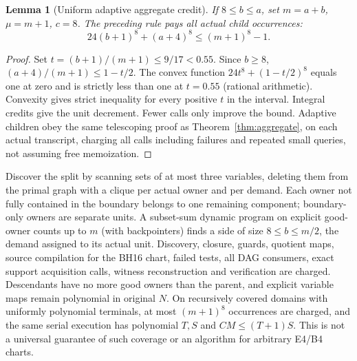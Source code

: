 \documentclass[11pt]{article}
\newtheorem{lemma}[theorem]{Lemma}
\begin{document}
\begin{lemma}[Uniform adaptive aggregate credit]\label{lem:dp17-credit}
If $8\le b\le a$, set $m=a+b$, $\mu=m+1$, $c=8$. The preceding rule pays all actual child occurrences:
\[
24(b+1)^8+(a+4)^8\le (m+1)^8-1.
\]
\end{lemma}
\begin{proof}
Set $t=(b+1)/(m+1)\le9/17<0.55$. Since $b\ge8$, $(a+4)/(m+1)\le1-t/2$. The convex function $24t^8+(1-t/2)^8$ equals one at zero and is strictly less than one at $t=0.55$ (rational arithmetic). Convexity gives strict inequality for every positive $t$ in the interval. Integral credits give the unit decrement. Fewer calls only improve the bound. Adaptive children obey the same telescoping proof as Theorem~\ref{thm:aggregate}, on each actual transcript, charging all calls including failures and repeated small queries, not assuming free memoization.
\end{proof}
Discover the split by scanning sets of at most three variables, deleting them from the primal graph with a clique per actual owner and per demand. Each owner not fully contained in the boundary belongs to one remaining component; boundary-only owners are separate units. A subset-sum dynamic program on explicit good-owner counts up to $m$ (with backpointers) finds a side of size $8\le b\le m/2$, the demand assigned to its actual unit. Discovery, closure, guards, quotient maps, source compilation for the BH16 chart, failed tests, all DAG consumers, exact support acquisition calls, witness reconstruction and verification are charged. Descendants have no more good owners than the parent, and explicit variable maps remain polynomial in original $N$. On recursively covered domains with uniformly polynomial terminals, at most $(m+1)^8$ occurrences are charged, and the same serial execution has polynomial $T,S$ and $CM\le(T+1)S$. This is not a universal guarantee of such coverage or an algorithm for arbitrary E4/B4 charts.
\end{document}
